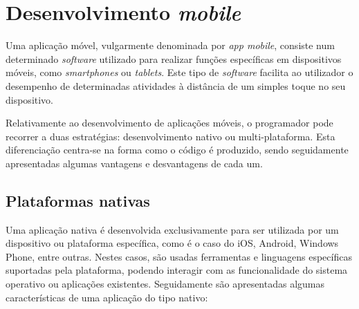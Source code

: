 \section{Desenvolvimento \textit{mobile}}


Uma aplicação móvel, vulgarmente denominada por \textit{app mobile}, consiste num determinado \textit{software} utilizado para realizar funções específicas em dispositivos móveis, como \textit{smartphones} ou \textit{tablets}. Este tipo de \textit{software} facilita ao utilizador o desempenho de determinadas atividades à distância de um simples toque no seu dispositivo. 

Relativamente ao desenvolvimento de aplicações móveis, o programador pode recorrer a duas estratégias: desenvolvimento nativo ou multi-plataforma. Esta diferenciação centra-se na forma como o código é produzido, sendo seguidamente apresentadas algumas  vantagens e desvantagens de cada um. 





\subsection{Plataformas nativas}

Uma aplicação nativa é desenvolvida exclusivamente para ser utilizada por um dispositivo ou plataforma específica, como é o caso do iOS, Android, Windows Phone, entre outras. Nestes casos, são usadas ferramentas e linguagens específicas suportadas pela plataforma, podendo interagir com as funcionalidade do sistema operativo ou aplicações existentes. Seguidamente são apresentadas algumas características de uma aplicação do tipo nativo\cite{Ibm2012a}: 








